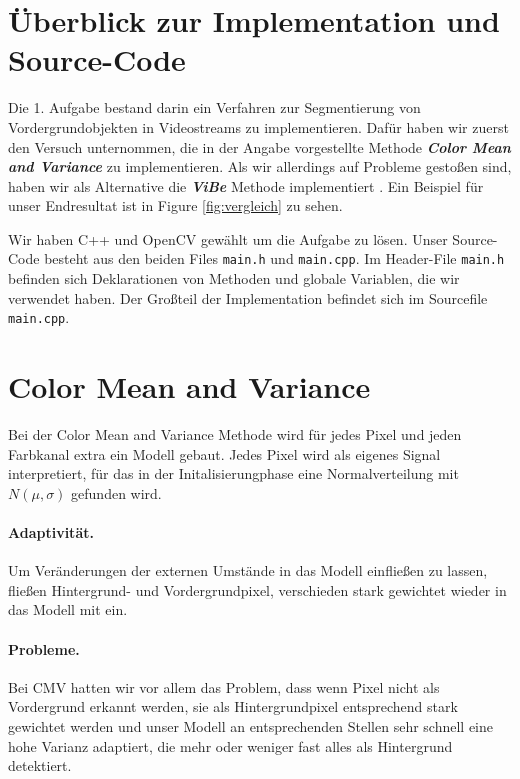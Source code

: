 \documentclass[]{scrartcl}
\begin{document}
\maketitle

\section{\"Uberblick zur Implementation und Source-Code}
Die 1. Aufgabe bestand darin ein Verfahren zur Segmentierung von Vordergrundobjekten in Videostreams zu implementieren. Daf\"ur haben wir zuerst den Versuch unternommen, die in der Angabe vorgestellte Methode \textbf{\textit{Color Mean and Variance}} zu implementieren. Als wir allerdings auf Probleme gesto\ss{}en sind, haben wir als Alternative die \textbf{\textit{ViBe}} Methode implementiert \cite{barnich2011vibe}. Ein Beispiel f\"ur unser Endresultat ist in Figure \ref{fig:vergleich} zu sehen.

Wir haben C++ und OpenCV gew\"ahlt um die Aufgabe zu l\"osen. Unser Source-Code besteht aus den beiden Files \texttt{main.h} und \texttt{main.cpp}. Im	 Header-File \texttt{main.h} befinden sich Deklarationen von Methoden und globale Variablen, die wir verwendet haben. Der Gro\ss{}teil der Implementation befindet sich im Sourcefile \texttt{main.cpp}. 

\section{Color Mean and Variance}\label{sec:cmv}
Bei der Color Mean and Variance Methode wird f\"ur jedes Pixel und jeden Farbkanal extra ein Modell gebaut. Jedes Pixel wird als eigenes Signal interpretiert, f\"ur das in der Initalisierungphase eine Normalverteilung mit $N(\mu, \sigma)$ gefunden wird. 

\paragraph{Adaptivit\"at.} 
Um Ver\"anderungen der externen Umst\"ande in das Modell einflie\ss{}en zu lassen, flie\ss{}en Hintergrund- und Vordergrundpixel, verschieden stark gewichtet wieder in das Modell mit ein.

\paragraph{Probleme.} 
Bei CMV hatten wir vor allem das Problem, dass wenn Pixel nicht als Vordergrund erkannt werden, sie als Hintergrundpixel entsprechend stark gewichtet werden und unser Modell an entsprechenden Stellen sehr schnell eine hohe Varianz adaptiert, die mehr oder weniger fast alles als Hintergrund detektiert.
\end{document}
